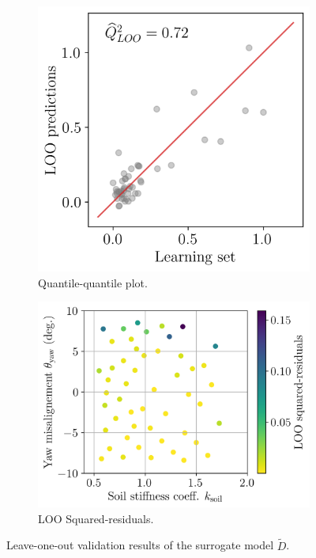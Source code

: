 \begin{figure}[h!]
    \centering
    \begin{subfigure}[t]{0.36\linewidth}
        \includegraphics[width=\linewidth]{./part3/figures/OWT/loo_qqplot.png}
        \caption{Quantile-quantile plot.}
    \end{subfigure}
    \begin{subfigure}[t]{0.48\linewidth}
        \includegraphics[width=\linewidth]{./part3/figures/OWT/loo_squared_res.png}
        \caption{LOO Squared-residuals.}
    \end{subfigure}
    \caption{Leave-one-out validation results of the surrogate model $\widetilde{D}$.}
    \label{fig:loo_validation}
\end{figure}

